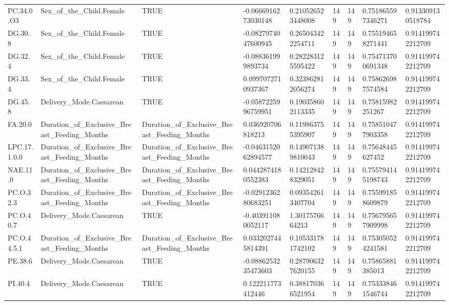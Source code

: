 \begin{longtable}{lllllllll}
PC.34.0.O3 & Sex\_of\_the\_Child.Female & TRUE & -0.0666916273030148 & 0.210526523448008 & 149 & 149 & 0.751865597346271 & 0.913309130518784 \\
DG.30.8 & Sex\_of\_the\_Child.Female & TRUE & -0.0827974047600945 & 0.265043422254711 & 149 & 149 & 0.755194658271441 & 0.914199742212709 \\
DG.32.4 & Sex\_of\_the\_Child.Female & TRUE & -0.088361999893734 & 0.282283125595422 & 149 & 149 & 0.754713700691348 & 0.914199742212709 \\
DG.33.4 & Sex\_of\_the\_Child.Female & TRUE & 0.0997072710937367 & 0.323862812056274 & 149 & 149 & 0.758626987574584 & 0.914199742212709 \\
DG.45.8 & Delivery\_Mode.Caesarean & TRUE & -0.0587225996759951 & 0.190358602113335 & 149 & 149 & 0.75815982251267 & 0.914199742212709 \\
FA.20.0 & Duration\_of\_Exclusive\_Breast\_Feeding\_Months & Duration\_of\_Exclusive\_Breast\_Feeding\_Months & 0.036920706818213 & 0.119863755395907 & 149 & 149 & 0.758510477903358 & 0.914199742212709 \\
LPC.17.1.0.0 & Duration\_of\_Exclusive\_Breast\_Feeding\_Months & Duration\_of\_Exclusive\_Breast\_Feeding\_Months & -0.0463152062894577 & 0.149071389810043 & 149 & 149 & 0.75648445627452 & 0.914199742212709 \\
NAE.11.0 & Duration\_of\_Exclusive\_Breast\_Feeding\_Months & Duration\_of\_Exclusive\_Breast\_Feeding\_Months & 0.0442874180552383 & 0.142128428329051 & 149 & 149 & 0.755794145198743 & 0.914199742212709 \\
PC.O.32.3 & Duration\_of\_Exclusive\_Breast\_Feeding\_Months & Duration\_of\_Exclusive\_Breast\_Feeding\_Months & -0.0291236280683251 & 0.093542613407704 & 149 & 149 & 0.755991858609879 & 0.914199742212709 \\
PC.O.40.7 & Delivery\_Mode.Caesarean & TRUE & -0.403911080052117 & 1.3017576664213 & 149 & 149 & 0.756795657909998 & 0.914199742212709 \\
PC.O.44.5.1 & Duration\_of\_Exclusive\_Breast\_Feeding\_Months & Duration\_of\_Exclusive\_Breast\_Feeding\_Months & 0.0332027445814391 & 0.105331781742102 & 149 & 149 & 0.753050524241581 & 0.914199742212709 \\
PE.38.6 & Delivery\_Mode.Caesarean & TRUE & -0.0886253235473603 & 0.287906327620155 & 149 & 149 & 0.75865881385013 & 0.914199742212709 \\
PI.40.4 & Delivery\_Mode.Caesarean & TRUE & 0.122211773412446 & 0.388170366521954 & 149 & 149 & 0.753338461546744 & 0.914199742212709 \\

\end{longtable}
